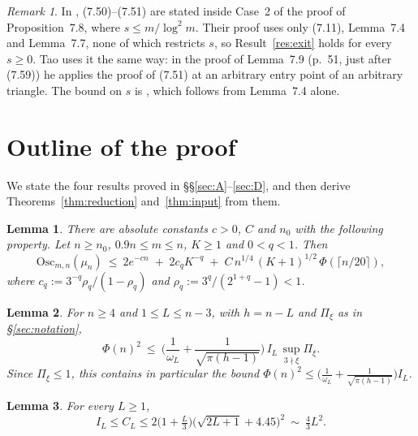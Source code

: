 \documentclass[11pt]{amsart}
\newtheorem{lemmaL}{Lemma}            %
\theoremstyle{remark}
\newtheorem{remark}{Remark}[section]
\newcommand{\Osc}{\mathrm{Osc}}
\newcommand{\T}[1]{\cite[#1]{Tao22}}   %
\newcommand{\Tc}{\cite{Tao22}}         %
\theoremstyle{plain}
\begin{document}
\begin{remark}\label{rem:exit-any-depth}
In \Tc, (7.50)--(7.51) are stated inside Case~2 of the proof of Proposition~7.8, where $s\le m/\log^2m$. Their proof uses only (7.11), Lemma~7.4 and Lemma~7.7, none of which restricts $s$, so Result~\ref{res:exit} holds for every $s\ge0$. Tao uses it the same way: in the proof of Lemma~7.9 (p.~51, just after (7.59)) he applies the proof of (7.51) at an arbitrary entry point of an arbitrary triangle. The bound on $s$ is \T{(7.52)}, which follows from Lemma~7.4 alone.
\end{remark}
\section{Outline of the proof}\label{sec:outline}

We state the four results proved in \S\S\ref{sec:A}--\ref{sec:D}, and then derive Theorems~\ref{thm:reduction} and~\ref{thm:input} from them.

\begin{lemmaL}\label{lem:A}
There are absolute constants $c>0$, $C$ and $n_0$ with the following property. Let $n\ge n_0$, $0.9n\le m\le n$, $K\ge1$ and $0<q<1$. Then
\[
\Osc_{m,n}(\mu_n)\ \le\ 2e^{-cn}\;+\;2c_qK^{-q}\;+\;C\,n^{1/4}\,(K+1)^{1/2}\,\Phi(\lceil n/20\rceil),
\]
where $c_q:=3^{-q}\rho_q/(1-\rho_q)$ and $\rho_q:=3^q/(2^{1+q}-1)<1$.
\end{lemmaL}

\begin{lemmaL}\label{lem:B}
For $n\ge4$ and $1\le L\le n-3$, with $h=n-L$ and $\Pi_\xi$ as in \S\ref{sec:notation},
\begin{equation}\label{eq:lemB}
\Phi(n)^2\ \le\ \Big(\frac{1}{\omega_L}+\frac{1}{\sqrt{\pi(h-1)}}\Big)\,I_L\,\sup_{3\nmid\xi}\Pi_\xi .
\end{equation}
Since $\Pi_\xi\le1$, this contains in particular the bound $\Phi(n)^2\le\big(\frac1{\omega_L}+\frac1{\sqrt{\pi(h-1)}}\big)I_L$.
\end{lemmaL}

\begin{lemmaL}\label{lem:C}
For every $L\ge1$,
\[
I_L\le C_L\le2\big(1+\tfrac L3\big)\big(\sqrt{2L+1}+4.45\big)^2\ \sim\ \tfrac43L^2 .
\]
\end{lemmaL}
\end{document}
